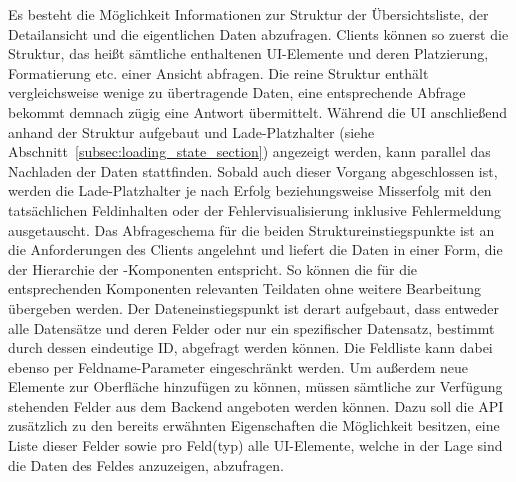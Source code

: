 Es besteht die Möglichkeit Informationen zur Struktur der Übersichtsliste, der Detailansicht und die eigentlichen Daten abzufragen. Clients können so zuerst die Struktur, das heißt sämtliche enthaltenen UI-Elemente und deren Platzierung, Formatierung etc. einer Ansicht abfragen. Die reine Struktur enthält vergleichsweise wenige zu übertragende Daten, eine entsprechende Abfrage bekommt demnach zügig eine Antwort übermittelt. Während die UI anschließend anhand der Struktur aufgebaut und Lade-Platzhalter (siehe Abschnitt~\ref{subsec:loading_state_section}) angezeigt werden, kann parallel das Nachladen der Daten stattfinden. Sobald auch dieser Vorgang abgeschlossen ist, werden die Lade-Platzhalter je nach Erfolg beziehungsweise Misserfolg mit den tatsächlichen Feldinhalten oder der Fehlervisualisierung inklusive Fehlermeldung ausgetauscht.
Das Abfrageschema für die beiden Struktureinstiegspunkte ist an die Anforderungen des Clients angelehnt und liefert die Daten in einer Form, die der Hierarchie der -Komponenten entspricht. So können die für die entsprechenden Komponenten relevanten Teildaten ohne weitere Bearbeitung übergeben werden. Der Dateneinstiegspunkt ist derart aufgebaut, dass entweder alle Datensätze und deren Felder oder nur ein spezifischer Datensatz, bestimmt durch dessen eindeutige ID, abgefragt werden können. Die Feldliste kann dabei ebenso per Feldname-Parameter eingeschränkt werden.
Um außerdem neue Elemente zur Oberfläche hinzufügen zu können, müssen sämtliche zur Verfügung stehenden Felder aus dem Backend angeboten werden können. Dazu soll die API zusätzlich zu den bereits erwähnten Eigenschaften die Möglichkeit besitzen, eine Liste dieser Felder sowie pro Feld(typ) alle UI-Elemente, welche in der Lage sind die Daten des Feldes anzuzeigen, abzufragen.

